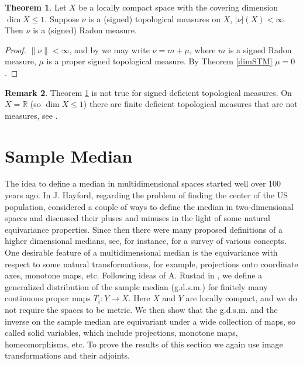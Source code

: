 \documentclass[sn-mathphys-num]{sn-jnl}%
\theoremstyle{thmstyleone}%
\theoremstyle{definition}
\newtheorem{theorem}{Theorem}%
\newtheorem{remark}[theorem]{Remark}
\begin{document}
\begin{theorem} \label{dimTh}
Let $X$ be a locally compact space with the covering dimension $\dim X \le 1$. 
Suppose $ \nu$ is a (signed) topological measures on $X$, $ | \nu |(X) < \infty$. Then $ \nu$ is a (signed) Radon measure.
\end{theorem}

\begin{proof}
$\| \nu \| < \infty$, and by \cite[Th. 5.3]{Butler:Decomp} we may write $ \nu = m + \mu$, where $m$ is a signed Radon measure, 
$ \mu$ is a proper signed topological measure. By  Theorem \ref{dimSTM} $ \mu = 0$. 
\end{proof}

\begin{remark}
Theorem \ref{dimTh} is not true for signed deficient topological measures. On $X = \mathbb{R}$ (so $\dim X \le 1$) 
there are finite deficient topological measures 
that are not measures, see \cite[Sect. 6]{Butler:DTMLC}.
\end{remark}  

\section{Sample Median} \label{SectSampleMed}

The idea to define a median in multidimensional spaces started well over 100 years ago. In \cite{Hayford} J. Hayford, regarding the problem of 
finding the center of the US population, considered a couple of ways to define the median in two-dimensional spaces 
and discussed their pluses and minuses in the light of some natural equivariance properties. 
Since then there were many proposed definitions of a higher 
dimensional medians, see, for instance, \cite{Small} for a survey of various concepts. 
One desirable feature of a multidimensional median is the equivariance with respect to some natural transformations, for example, 
projections onto coordinate axes, monotone maps, etc.   
Following ideas of  A. Rustad in \cite{AlfMedian},  we define a generalized distribution of the sample median (g.d.s.m.) 
for finitely many continuous proper maps $T_i : Y \longrightarrow X$. 
Here  $X$ and $Y$ are locally compact, and we do not require the spaces to be metric.
We then show that the g.d.s.m. and the inverse on the sample median are equivariant under a wide collection of maps, so called solid variables, 
which include projections, monotone maps, homeomorphisms, etc.     
To prove the results of this section we again use image transformations and their adjoints. 
\end{document}

